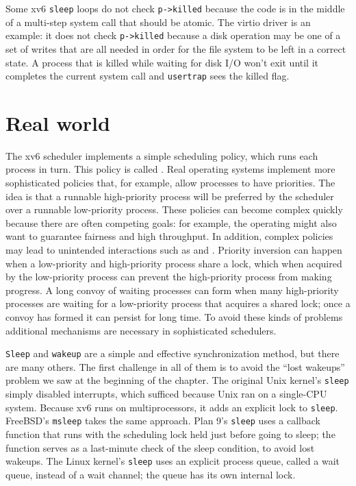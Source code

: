 Some xv6 
\lstinline{sleep}
loops do not check
\lstinline{p->killed} 
because the code is in the middle of a multi-step
system call that should be atomic.
The virtio driver
is an example: it does not check
\lstinline{p->killed}
because a disk operation may be one of a set of
writes that are all needed in order for the file system to
be left in a correct state.
A process that is killed while waiting for disk I/O won't
exit until it completes the current system call and
\lstinline{usertrap} sees the killed flag.
\section{Real world}

The xv6 scheduler implements a simple scheduling policy, which runs each process
in turn.  This policy is called
.
Real operating systems implement more sophisticated policies that, for example,
allow processes to have priorities.  The idea is that a runnable high-priority process
will be preferred by the scheduler over a runnable low-priority process.   These
policies can become complex quickly because there are often competing goals: for
example, the operating might also want to guarantee fairness and
high throughput.  In addition, complex policies may lead to unintended
interactions such as
and 
.
Priority inversion can happen when a low-priority and high-priority process
share a lock, which when acquired by the low-priority process can prevent the
high-priority process from making progress.  A long convoy of waiting processes
can form when many
high-priority processes are waiting for a low-priority process that acquires a
shared lock; once a convoy has formed it can persist for long time.
To avoid these kinds of problems additional mechanisms are necessary in
sophisticated schedulers.

\lstinline{Sleep}
and
\lstinline{wakeup}
are a simple and effective synchronization method,
but there are many others.
The first challenge in all of them is to
avoid the ``lost wakeups'' problem we saw at the
beginning of the chapter.
The original Unix kernel's
\lstinline{sleep}
simply disabled interrupts,
which sufficed because Unix ran on a single-CPU system.
Because xv6 runs on multiprocessors,
it adds an explicit lock to
\lstinline{sleep}.
FreeBSD's
\lstinline{msleep}
takes the same approach.
Plan 9's 
\lstinline{sleep}
uses a callback function that runs with the scheduling
lock held just before going to sleep;
the function serves as a last-minute check
of the sleep condition, to avoid lost wakeups.
The Linux kernel's
\lstinline{sleep}
uses an explicit process queue, called a wait queue, instead of
a wait channel; the queue has its own internal lock.

